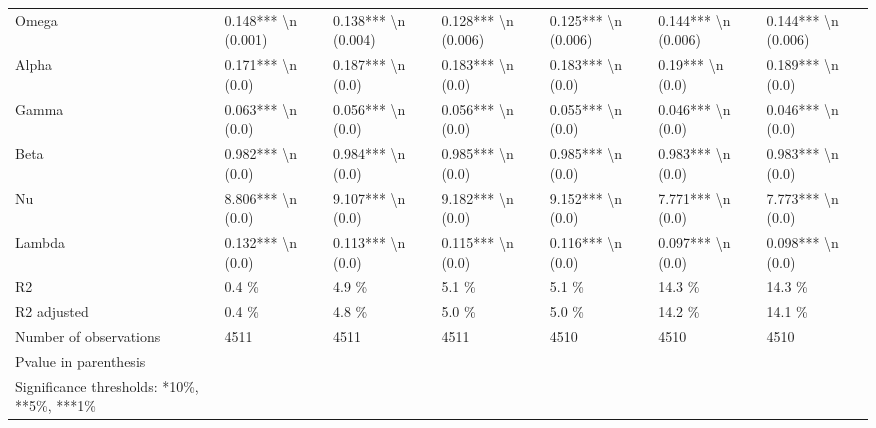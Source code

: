 \begin{tabular}{lllllll}
Omega                                      &  0.148*** \textbackslash n (0.001) &  0.138*** \textbackslash n (0.004) &   0.128*** \textbackslash n (0.006) &  0.125*** \textbackslash n (0.006) &   0.144*** \textbackslash n (0.006) &  0.144*** \textbackslash n (0.006) \\
Alpha                                      &    0.171*** \textbackslash n (0.0) &    0.187*** \textbackslash n (0.0) &     0.183*** \textbackslash n (0.0) &    0.183*** \textbackslash n (0.0) &      0.19*** \textbackslash n (0.0) &    0.189*** \textbackslash n (0.0) \\
Gamma                                      &    0.063*** \textbackslash n (0.0) &    0.056*** \textbackslash n (0.0) &     0.056*** \textbackslash n (0.0) &    0.055*** \textbackslash n (0.0) &     0.046*** \textbackslash n (0.0) &    0.046*** \textbackslash n (0.0) \\
Beta                                       &    0.982*** \textbackslash n (0.0) &    0.984*** \textbackslash n (0.0) &     0.985*** \textbackslash n (0.0) &    0.985*** \textbackslash n (0.0) &     0.983*** \textbackslash n (0.0) &    0.983*** \textbackslash n (0.0) \\
Nu                                         &    8.806*** \textbackslash n (0.0) &    9.107*** \textbackslash n (0.0) &     9.182*** \textbackslash n (0.0) &    9.152*** \textbackslash n (0.0) &     7.771*** \textbackslash n (0.0) &    7.773*** \textbackslash n (0.0) \\
Lambda                                     &    0.132*** \textbackslash n (0.0) &    0.113*** \textbackslash n (0.0) &     0.115*** \textbackslash n (0.0) &    0.116*** \textbackslash n (0.0) &     0.097*** \textbackslash n (0.0) &    0.098*** \textbackslash n (0.0) \\
R2                                         &                0.4 \% &                4.9 \% &                 5.1 \% &                5.1 \% &                14.3 \% &               14.3 \% \\
R2 adjusted                                &                0.4 \% &                4.8 \% &                 5.0 \% &                5.0 \% &                14.2 \% &               14.1 \% \\
Number of observations                     &                 4511 &                 4511 &                  4511 &                 4510 &                  4510 &                 4510 \\
Pvalue in parenthesis                      &                      &                      &                       &                      &                       &                      \\
Significance thresholds: *10\%, **5\%, ***1\% &                      &                      &                       &                      &                       &                      \\
\bottomrule
\end{tabular}
